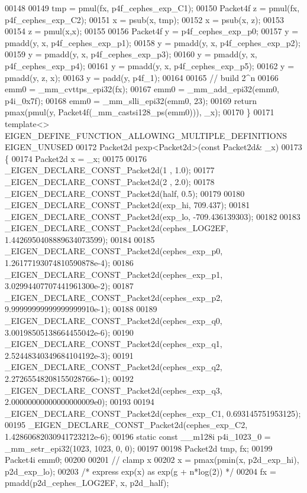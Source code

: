\begin{DoxyCode}
00148 
00149   tmp = pmul(fx, p4f\_cephes\_exp\_C1);
00150   Packet4f z = pmul(fx, p4f\_cephes\_exp\_C2);
00151   x = psub(x, tmp);
00152   x = psub(x, z);
00153 
00154   z = pmul(x,x);
00155 
00156   Packet4f y = p4f\_cephes\_exp\_p0;
00157   y = pmadd(y, x, p4f\_cephes\_exp\_p1);
00158   y = pmadd(y, x, p4f\_cephes\_exp\_p2);
00159   y = pmadd(y, x, p4f\_cephes\_exp\_p3);
00160   y = pmadd(y, x, p4f\_cephes\_exp\_p4);
00161   y = pmadd(y, x, p4f\_cephes\_exp\_p5);
00162   y = pmadd(y, z, x);
00163   y = padd(y, p4f\_1);
00164 
00165   \textcolor{comment}{// build 2^n}
00166   emm0 = \_mm\_cvttps\_epi32(fx);
00167   emm0 = \_mm\_add\_epi32(emm0, p4i\_0x7f);
00168   emm0 = \_mm\_slli\_epi32(emm0, 23);
00169   \textcolor{keywordflow}{return} pmax(pmul(y, Packet4f(\_mm\_castsi128\_ps(emm0))), \_x);
00170 \}
00171 \textcolor{keyword}{template}<> EIGEN\_DEFINE\_FUNCTION\_ALLOWING\_MULTIPLE\_DEFINITIONS EIGEN\_UNUSED
00172 Packet2d pexp<Packet2d>(\textcolor{keyword}{const} Packet2d& \_x)
00173 \{
00174   Packet2d x = \_x;
00175 
00176   \_EIGEN\_DECLARE\_CONST\_Packet2d(1 , 1.0);
00177   \_EIGEN\_DECLARE\_CONST\_Packet2d(2 , 2.0);
00178   \_EIGEN\_DECLARE\_CONST\_Packet2d(half, 0.5);
00179 
00180   \_EIGEN\_DECLARE\_CONST\_Packet2d(exp\_hi,  709.437);
00181   \_EIGEN\_DECLARE\_CONST\_Packet2d(exp\_lo, -709.436139303);
00182 
00183   \_EIGEN\_DECLARE\_CONST\_Packet2d(cephes\_LOG2EF, 1.4426950408889634073599);
00184 
00185   \_EIGEN\_DECLARE\_CONST\_Packet2d(cephes\_exp\_p0, 1.26177193074810590878e-4);
00186   \_EIGEN\_DECLARE\_CONST\_Packet2d(cephes\_exp\_p1, 3.02994407707441961300e-2);
00187   \_EIGEN\_DECLARE\_CONST\_Packet2d(cephes\_exp\_p2, 9.99999999999999999910e-1);
00188 
00189   \_EIGEN\_DECLARE\_CONST\_Packet2d(cephes\_exp\_q0, 3.00198505138664455042e-6);
00190   \_EIGEN\_DECLARE\_CONST\_Packet2d(cephes\_exp\_q1, 2.52448340349684104192e-3);
00191   \_EIGEN\_DECLARE\_CONST\_Packet2d(cephes\_exp\_q2, 2.27265548208155028766e-1);
00192   \_EIGEN\_DECLARE\_CONST\_Packet2d(cephes\_exp\_q3, 2.00000000000000000009e0);
00193 
00194   \_EIGEN\_DECLARE\_CONST\_Packet2d(cephes\_exp\_C1, 0.693145751953125);
00195   \_EIGEN\_DECLARE\_CONST\_Packet2d(cephes\_exp\_C2, 1.42860682030941723212e-6);
00196   \textcolor{keyword}{static} \textcolor{keyword}{const} \_\_m128i p4i\_1023\_0 = \_mm\_setr\_epi32(1023, 1023, 0, 0);
00197 
00198   Packet2d tmp, fx;
00199   Packet4i emm0;
00200 
00201   \textcolor{comment}{// clamp x}
00202   x = pmax(pmin(x, p2d\_exp\_hi), p2d\_exp\_lo);
00203   \textcolor{comment}{/* express exp(x) as exp(g + n*log(2)) */}
00204   fx = pmadd(p2d\_cephes\_LOG2EF, x, p2d\_half);

\end{DoxyCode}
